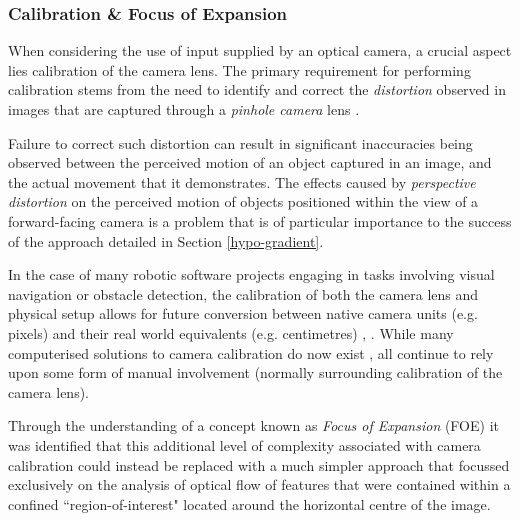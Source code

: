  
\subsubsection{Calibration \& Focus of Expansion}
\label{hypo-calib}

When considering the use of input supplied by an optical camera, a crucial aspect lies calibration of the camera lens. The primary requirement for performing calibration stems from the need to identify and correct the \textit{distortion} observed in images that are captured through a \textit{pinhole camera} lens \cite{camera-calib}. 

Failure to correct such distortion can result in significant inaccuracies being observed between the perceived motion of an object captured in an image, and the actual movement that it demonstrates. The effects caused by \textit{perspective distortion} on the perceived motion of objects positioned within the view of a forward-facing camera is a problem that is of particular importance to the success of the approach detailed in Section \ref{hypo-gradient}.


In the case of many robotic software projects engaging in tasks involving visual navigation or obstacle detection, the calibration of both the camera lens and physical setup allows for future conversion between native camera units (e.g. pixels) and their real world equivalents (e.g. centimetres) \cite{campbell}, \cite{wyeth}. While many computerised solutions to camera calibration do now exist \cite{camera-calib}, all continue to rely upon some form of manual involvement (normally surrounding calibration of the camera lens). 

Through the understanding of a concept known as \textit{Focus of Expansion} (FOE) it was identified that this additional level of complexity associated with camera calibration could instead be replaced with a much simpler approach that focussed exclusively on the analysis of optical flow of features that were contained within a confined ``region-of-interest" located around the horizontal centre of the image.

